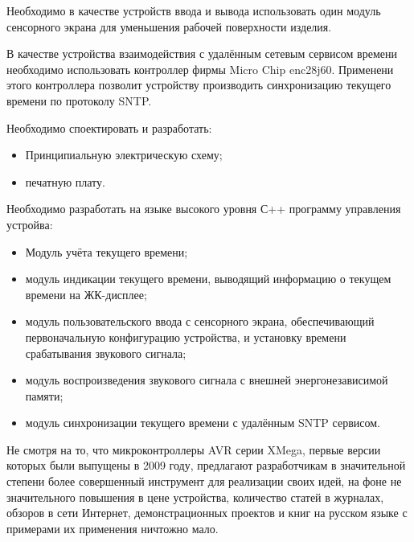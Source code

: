 \begin{par}
Необходимо в качестве устройств ввода и вывода использовать один модуль сенсорного экрана
для уменьшения рабочей поверхности изделия.
\end{par}

\begin{par}
В качестве устройства взаимодействия с удалённым сетевым сервисом времени необходимо использовать
контроллер фирмы Micro Chip enc28j60. Применени этого контроллера позволит устройству производить
синхронизацию текущего времени по протоколу SNTP.
\end{par}

\begin{par}
Необходимо споектировать и разработать:
    \begin{itemize}
        \item{}Принципиальную электрическую схему;
        \item{}печатную плату.
    \end{itemize}
\end{par}

\begin{par}
Необходимо разработать на языке высокого уровня С++  программу управления устройва:
\begin{itemize}
    \item{} Модуль учёта текущего времени;
    \item{} модуль индикации текущего времени, выводящий информацию о текущем времени на ЖК-дисплее;
    \item{} модуль пользовательского ввода с сенсорного экрана, обеспечивающий первоначальную
            конфигурацию устройства, и установку времени срабатывания звукового сигнала;
    \item{} модуль воспроизведения звукового сигнала с внешней энергонезависимой памяти;
    \item{} модуль синхронизации текущего времени с удалённым SNTP сервисом.
\end{itemize}
\end{par}


\begin{par}
Не смотря на то, что микроконтроллеры AVR серии XMega, первые версии которых были выпущены в 2009 году,
предлагают разработчикам в значительной степени более совершенный инструмент для
реализации своих идей, на фоне не значительного повышения в цене устройства, количество статей в журналах,
обзоров в сети Интернет, демонстрационных проектов и книг на русском языке с примерами их применения
ничтожно мало.
\end{par}

